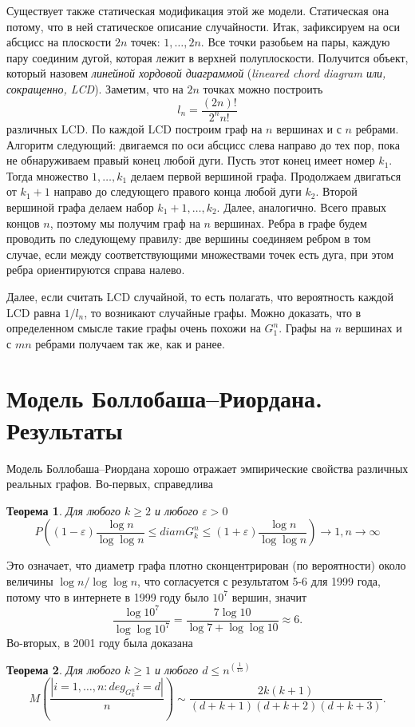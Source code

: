 \documentclass[14pt]{extreport}
\begin{document}
Существует также статическая модификация этой же модели. Статическая она потому, что в ней статическое описание случайности.
Итак, зафиксируем на оси абсцисс на плоскости $2n$ точек: $1, \dots, 2n$. Все точки разобьем на пары, каждую пару соединим дугой, которая лежит в верхней полуплоскости. Получится объект, который назовем {\it линейной хордовой диаграммой} ({\it lineared chord diagram или, сокращенно, LCD}). Заметим, что на $2n$ точках можно построить
$$
l_n = \frac{(2n)!}{2^nn!}
$$
различных LCD. По каждой LCD построим граф на $n$ вершинах и с $n$ ребрами. Алгоритм следующий: двигаемся по оси абсцисс слева направо до тех пор, пока не обнаруживаем правый конец любой дуги. Пусть этот конец имеет номер $k_1$. Тогда множество ${1, \dots, k_1}$ делаем первой вершиной графа. Продолжаем двигаться от $k_1 + 1$ направо до следующего правого конца любой дуги $k_2$. Второй вершиной графа делаем набор ${k_1 + 1, \dots, k_2}$. Далее, аналогично. Всего правых концов $n$, поэтому мы получим граф на $n$ вершинах. Ребра в графе будем проводить по следующему правилу: две вершины соединяем ребром в том случае, если между соответствующими множествами точек есть дуга, при этом ребра ориентируются справа налево.

Далее, если считать LCD случайной, то есть полагать, что вероятность каждой LCD равна $1/l_n$, то возникают случайные графы. Можно доказать, что в определенном смысле такие графы очень похожи на $G_1^n$. Графы на $n$ вершинах и с $mn$ ребрами получаем так же, как и ранее.

\section{Модель Боллобаша--Риордана. Результаты}

Модель Боллобаша--Риордана хорошо отражает эмпирические свойства различных реальных графов. Во-первых, справедлива
\newtheorem{theorem}{Теорема}
\begin{theorem}
Для любого $k \geqslant 2$ и любого $\varepsilon > 0$
$$
P\left((1-\varepsilon)\frac{\log n}{\log \log n} \leqslant diam G_k^n \leqslant (1+\varepsilon)\frac{\log n}{\log \log n}\right) \to 1, n \to \infty
$$
\end{theorem}
Это означает, что диаметр графа плотно сконцентрирован (по вероятности) около величины $\log n / \log \log n$, что согласуется с результатом 5-6 для 1999 года, потому что в интернете в 1999 году было $10^7$ вершин, значит
$$
\frac{\log 10^7}{\log \log 10^7} = \frac {7\log 10}{\log 7 + \log\log 10} \approx 6.
$$
Во-вторых, в 2001 году была доказана
\begin{theorem}
Для любого $k \geqslant 1$ и любого $d \leqslant n^{\left(\frac{1}{15}\right)}$
$$
M\left(\frac{|{i=1,\dots,n:deg_{G_k^n}i = d}|}{n}\right) \sim \frac{2k(k+1)}{(d+k+1)(d+k+2)(d+k+3)}.
$$
\end{theorem}
\end{document}
